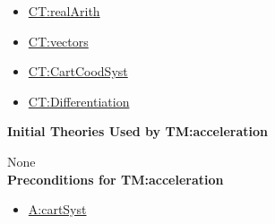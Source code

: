 \documentclass[12pt]{article}
\begin{document}
\begin{itemize}
\item \hyperref[CT:realArith]{CT:realArith}
\item \hyperref[CT:vectors]{CT:vectors}
\item \hyperref[CT:CartCoordSyst]{CT:CartCoodSyst}
\item \hyperref[CT:Differentiation]{CT:Differentiation}
\end{itemize}

\noindent \textbf{Initial Theories Used by TM:acceleration}

None
~\\

\noindent \textbf{Preconditions for TM:acceleration}

\begin{itemize}
\item \hyperref[cartSyst]{A:cartSyst}
\end{itemize}
\end{document}
